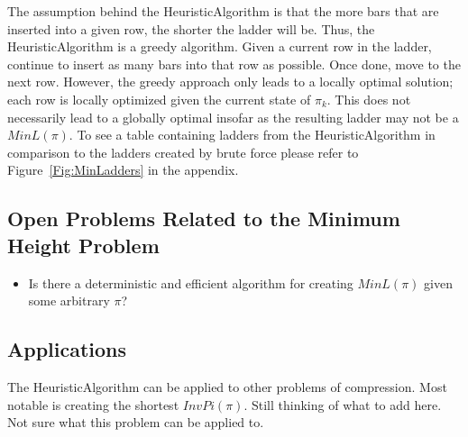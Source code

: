 The assumption behind the {\sc HeuristicAlgorithm} is that the more bars that are 
inserted into a given row, the shorter the ladder will be. Thus, the {\sc HeuristicAlgorithm} is 
a greedy algorithm. Given a 
current row in the ladder, continue to insert as many bars into that row as possible.
Once done, move to the next row. However, the greedy approach only leads 
to a locally optimal solution; each row is locally optimized given the current state 
of $\pi_{k}$. This does not necessarily lead to a globally optimal insofar as 
the resulting ladder may not be a $MinL(\pi)$. To see a table containing ladders from the {\sc HeuristicAlgorithm}
in comparison to the ladders created by brute force please refer to Figure~\ref{Fig:MinLadders} in the appendix.

\subsection{Open Problems Related to the Minimum Height Problem}
\begin{itemize}
    \item Is there a deterministic and efficient algorithm for creating $MinL(\pi)$ given some arbitrary $\pi$?
\end{itemize}
\subsection{Applications}
The {\sc HeuristicAlgorithm} can be applied to other problems of compression. Most notable is creating the 
shortest $InvPi(\pi)$. Still thinking of what to add here. Not sure what this problem can be applied to.
